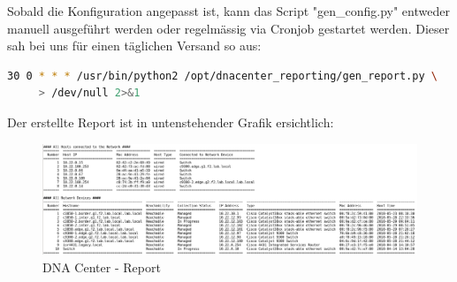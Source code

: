Sobald die Konfiguration angepasst ist, kann das Script "gen\_config.py" entweder manuell ausgeführt werden oder regelmässig via Cronjob gestartet werden. Dieser sah bei uns für einen täglichen Versand so aus:

\begin{lstlisting}[language=bash]
30 0 * * * /usr/bin/python2 /opt/dnacenter_reporting/gen_report.py \
     > /dev/null 2>&1
\end{lstlisting}

Der erstellte Report ist in untenstehender Grafik ersichtlich:

\begin{figure}[H]
	\centering
	\includegraphics[width=17cm]{img/secondtry/report.png}
	\caption{DNA Center - Report}
	\label{fig:Report}
\end{figure}